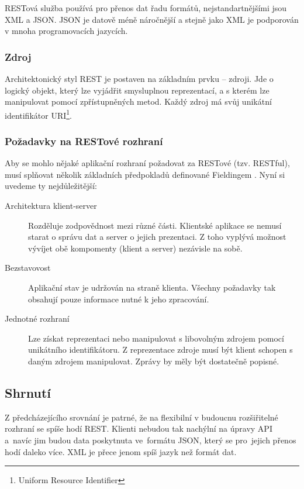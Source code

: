 RESTová služba používá pro přenos dat řadu formátů, nejstandartnějšími jsou XML a JSON.
JSON je datově méně náročnější a stejně jako XML je podporován v mnoha programovacích jazycích.

\subsubsection*{Zdroj}

Architektonický styl REST je postaven na základním prvku -- zdroji. Jde o logický objekt,
který lze vyjádřit smysluplnou reprezentací, a s kterém lze manipulovat pomocí zpřístupněných metod.
Každý zdroj má svůj unikátní identifikátor URI\footnote{Uniform Resource Identifier}.

\subsubsection*{Požadavky na RESTové rozhraní}

Aby se mohlo nějaké aplikační rozhraní požadovat za RESTové (tzv. RESTful),
musí splňovat několik základních předpokladů definované Fieldingem \cite{fielding}.
Nyní si uvedeme ty nejdůležitější:

\begin{description}
    \item[Architektura klient-server]
    Rozděluje zodpovědnost mezi různé části. Klientské aplikace se nemusí starat o správu dat a server o jejich prezentaci.
    Z toho vyplývá možnost vývíjet obě kompomenty (klient a server) nezávisle na sobě.
    \item[Bezstavovost]
    Aplikační stav je udržován na straně klienta. Všechny požadavky tak obsahují pouze informace nutné k jeho zpracování.  
    \item[Jednotné rozhraní]
    Lze získat reprezentaci nebo manipulovat s libovolným zdrojem pomocí unikátního identifikátoru.
    Z reprezentace zdroje musí být klient schopen s daným zdrojem manipulovat. Zprávy by měly být dostatečně popisné.
\end{description}


\subsection{Shrnutí}

Z předcházejícího srovnání je patrné, že na flexibilní v budoucnu rozšiřitelné rozhraní se spíše hodí REST.
Klienti nebudou tak nachýlní na úpravy API a~navíc jim budou data poskytnuta ve~formátu JSON,
který se pro~jejich přenos hodí daleko více. XML je přece jenom spíš jazyk než formát dat.
